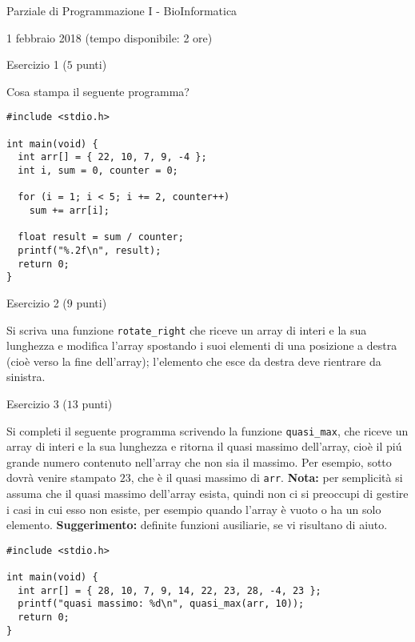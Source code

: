 \documentclass[12pt]{article}
\begin{document}
\begin{center}{\LARGE Parziale di Programmazione I - BioInformatica}\\
\vspace*{-2ex}
\begin{center}
  \large 1 febbraio 2018 (tempo disponibile: 2 ore)
\end{center}
\end{center}

\begin{center}{\Large Esercizio 1} ($5$ punti)
\end{center}

Cosa stampa il seguente programma?

\begin{lstlisting}
#include <stdio.h>

int main(void) {
  int arr[] = { 22, 10, 7, 9, -4 };
  int i, sum = 0, counter = 0;

  for (i = 1; i < 5; i += 2, counter++)
    sum += arr[i];

  float result = sum / counter;
  printf("%.2f\n", result);
  return 0;
}
\end{lstlisting}

\vspace*{1ex}
\begin{center}{\Large Esercizio 2} ($9$ punti)
\end{center}
Si scriva una funzione \texttt{rotate\_right} che riceve un array di interi e la sua lunghezza e modifica l'array spostando i suoi elementi di una posizione a destra (cio\`e verso la fine dell'array); l'elemento che esce da destra deve rientrare da sinistra.

\vspace*{1ex}
\begin{center}{\Large Esercizio 3} ($13$ punti)\end{center}
%
Si completi il seguente programma scrivendo la funzione
\texttt{quasi\_max}, che riceve un array di interi e la sua lunghezza
e ritorna il quasi massimo dell'array, cio\`e il pi\'u grande numero
contenuto nell'array che non sia il massimo. Per esempio, sotto
dovr\`a venire stampato $23$, che \`e il quasi massimo di \texttt{arr}.
\textbf{Nota:} per semplicit\`a
si assuma che il quasi massimo dell'array
esista, quindi non ci si preoccupi di gestire i casi in cui
esso non esiste, per esempio quando l'array \`e vuoto
o ha un solo elemento. \textbf{Suggerimento:} definite funzioni
ausiliarie, se vi risultano di aiuto.
%
\begin{lstlisting}
#include <stdio.h>

int main(void) {
  int arr[] = { 28, 10, 7, 9, 14, 22, 23, 28, -4, 23 };
  printf("quasi massimo: %d\n", quasi_max(arr, 10));
  return 0;
}
\end{lstlisting}
\end{document}
